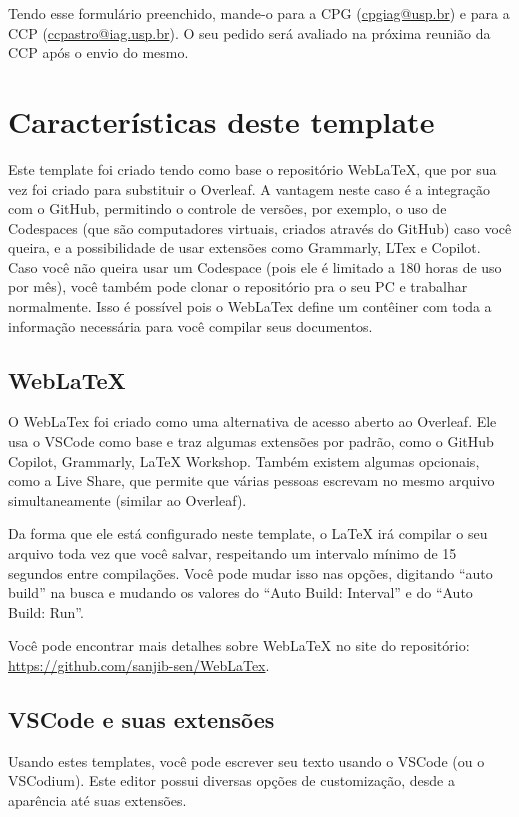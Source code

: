     Tendo esse formulário preenchido, mande-o para a CPG (\url{cpgiag@usp.br}) e para a CCP (\url{ccpastro@iag.usp.br}). O seu pedido será avaliado na próxima reunião da CCP após o envio do mesmo.

\chapter{Características deste template}
  Este template foi criado tendo como base o repositório Web\LaTeX{}, que por sua vez foi criado para substituir o Overleaf. A vantagem neste caso é a integração com o GitHub, permitindo o controle de versões, por exemplo, o uso de Codespaces (que são computadores virtuais, criados através do GitHub) caso você queira, e a possibilidade de usar extensões como Grammarly, LTex e Copilot. Caso você não queira usar um Codespace (pois ele é limitado a 180 horas de uso por mês), você também pode clonar o repositório pra o seu PC e trabalhar normalmente. Isso é possível pois o WebLaTex define um contêiner com toda a informação necessária para você compilar seus documentos.

  \section{Web\LaTeX{}}
    O WebLaTex foi criado como uma alternativa de acesso aberto ao Overleaf. Ele usa o VSCode como base e traz algumas extensões por padrão, como o GitHub Copilot, Grammarly, \LaTeX{} Workshop. Também existem algumas opcionais, como a Live Share, que permite que várias pessoas escrevam no mesmo arquivo simultaneamente (similar ao Overleaf).

    Da forma que ele está configurado neste template, o \LaTeX{} irá compilar o seu arquivo toda vez que você salvar, respeitando um intervalo mínimo de 15 segundos entre compilações. Você pode mudar isso nas opções, digitando ``auto build'' na busca e mudando os valores do ``Auto Build: Interval'' e do ``Auto Build: Run''.

    Você pode encontrar mais detalhes sobre Web\LaTeX{} no site do repositório: \url{https://github.com/sanjib-sen/WebLaTex}.

  \section{VSCode e suas extensões}
    Usando estes templates, você pode escrever seu texto usando o VSCode (ou o VSCodium). Este editor possui diversas opções de customização, desde a aparência até suas extensões.


